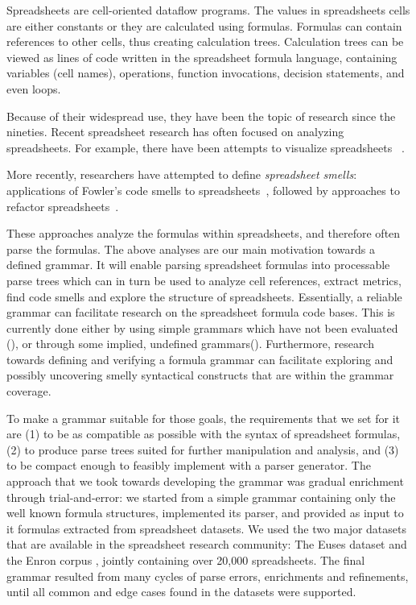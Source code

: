 \documentclass[conference]{IEEEtran}
\begin{document}
Spreadsheets are cell-oriented dataflow programs. The values in spreadsheets cells are either constants or they are calculated using formulas. Formulas can contain references to other cells, thus creating calculation trees. Calculation trees can be viewed as lines of code written in the spreadsheet formula language, containing variables (cell names), operations, function invocations, decision statements, and even loops. 

Because of their widespread use, they have been the topic of research since the nineties\cite{DBLP:journals/sigplan/BellP93}. Recent spreadsheet research has often focused on analyzing spreadsheets. For example, there have been attempts to visualize spreadsheets ~\cite{DBLP:conf/icse/HermansPD11, Shio1999}. 

More recently, researchers have attempted to define \emph{spreadsheet smells}: applications of Fowler's code smells to spreadsheets~\cite{DBLP:conf/icse/HermansPD12, DBLP:conf/icsm/Hermans212}, followed by approaches to refactor spreadsheets~\cite{hermans2014bumblebee,badame2012refactoring}.

These approaches analyze the formulas within spreadsheets, and therefore often parse the formulas. The above analyses are our main motivation towards a defined grammar. It will enable parsing spreadsheet formulas into processable parse trees which can in turn be used to analyze cell references, extract metrics, find code smells and explore the structure of spreadsheets. Essentially, a reliable grammar can facilitate research on the spreadsheet formula code bases. This is currently done either by using simple grammars which have not been evaluated (\cite{badame2012refactoring}), or through some implied, undefined grammars(\cite{DBLP:conf/icse/HermansPD11,DBLP:conf/icse/HermansPD12, DBLP:conf/icsm/Hermans212, hermans2014bumblebee}). Furthermore, research towards defining and verifying a formula grammar can facilitate exploring and possibly uncovering smelly syntactical constructs that are within the grammar coverage.

To make a grammar suitable for those goals, the requirements that we set for it are (1) to be as compatible as possible with the syntax of spreadsheet formulas, (2) to produce parse trees suited for further manipulation and analysis, and (3) to be compact enough to feasibly implement with a parser generator. The approach that we took towards developing the grammar was gradual enrichment through trial-and-error: we started from a simple grammar containing only the well known formula structures, implemented its parser, and provided as input to it formulas extracted from spreadsheet datasets. We used the two major datasets that are available in the spreadsheet research community: The Euses dataset \cite{euses} and the Enron corpus \cite{enron}, jointly containing over 20,000 spreadsheets. The final grammar resulted from many cycles of parse errors, enrichments and refinements, until all common and edge cases found in the datasets were supported.
\end{document}
